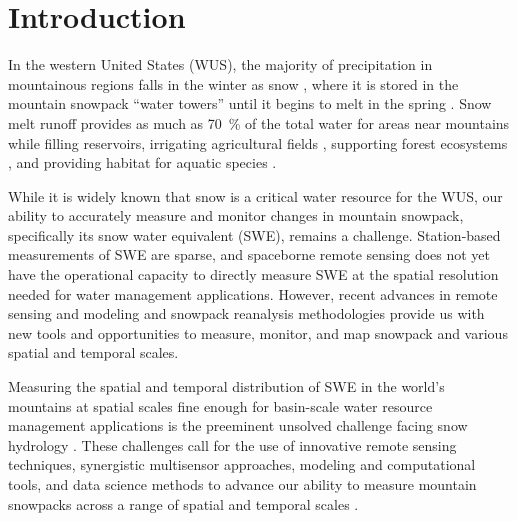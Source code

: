 
\hypertarget{ch1}{%
\chapter{Introduction}\label{ch1}}


In the western United States (WUS), the majority of precipitation in mountainous regions falls in the winter as snow \citep{serrezeCharacteristicsWesternUnited1999}, where it is stored in the mountain snowpack ``water towers” until it begins to melt in the spring \citep{immerzeelImportanceVulnerabilityWorld2020,viviroliIncreasingDependenceLowland2020}. Snow melt runoff provides as much as 70~\% of the total water for areas near mountains \citep{liHowMuchRunoff2017} while filling reservoirs, irrigating agricultural fields \citep{qinSnowmeltRiskTelecouplings2022a}, supporting forest ecosystems \citep{varholaForestCanopyEffects2010}, and providing habitat for aquatic species \citep{yarnellEcologyManagementSpring2010}. 

While it is widely known that snow is a critical water resource for the WUS, our ability to accurately measure and monitor changes in mountain snowpack, specifically its snow water equivalent (SWE), remains a challenge. Station-based measurements of SWE are sparse, and spaceborne remote sensing does not yet have the operational capacity to directly measure SWE at the spatial resolution needed for water management applications. However, recent advances in remote sensing and modeling \citep{lievensSnowDepthVariability2019,tarriconeEstimatingSnowAccumulation2023a,tsangReviewArticleGlobal2022,hedrickDirectInsertionNASA2018} and snowpack reanalysis methodologies \citep{margulisLandsatEraSierraNevada2016} provide us with new tools and opportunities to measure, monitor, and map snowpack and various spatial and temporal scales.

Measuring the spatial and temporal distribution of SWE in the world’s mountains at spatial scales fine enough for basin-scale water resource management applications is the preeminent unsolved challenge facing snow hydrology \citep{lettenmaierInroadsRemoteSensing2015, dozierEstimatingSpatialDistribution2016}. These challenges call for the use of innovative remote sensing techniques, synergistic multisensor approaches, modeling and computational tools, and data science methods to advance our ability to measure mountain snowpacks across a range of spatial and temporal scales \citep{dozierMountainHydrologySnow2011}. 

